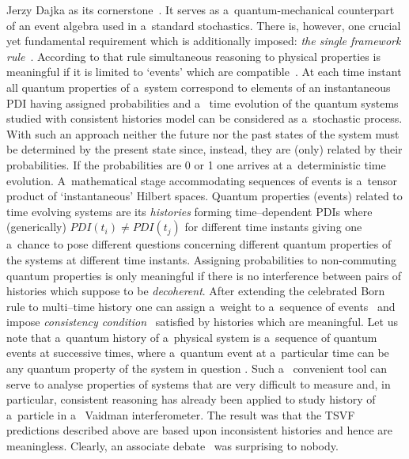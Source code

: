 \begin{artengenv}{Jerzy Dajka}
as its cornerstone~\parencite{Griffiths}. It   serves as a~quantum-mechanical counterpart of an event algebra used in a~standard stochastics. There is, however, one  crucial yet fundamental requirement which is additionally imposed: {\it the single framework rule}~\parencite{Griffiths,Griffiths_reason,GRIFFITHS_measur}. According to that rule  simultaneous reasoning to physical properties is meaningful if it is limited to  `events'  which are compatible~\parencite{Griffiths,Griffiths_reason,GRIFFITHS_measur,GRIFFITHS_onto}. 
At each time instant all  quantum properties of a~system correspond to elements of an instantaneous PDI having assigned probabilities and a~ time  evolution  of the quantum systems studied with consistent histories model can be considered as a~stochastic process. With such an approach neither 
the future nor the past states of the system must be 
determined by the present state since,  instead, they are (only) related by their probabilities. If the probabilities are 0 or 1 one arrives at a~deterministic time evolution. A~mathematical stage accommodating  sequences of events is a~tensor product of `instantaneous' Hilbert spaces. 
%
Quantum properties (events) related to time evolving systems are its {\it histories} forming time--dependent PDIs 
where (generically) $PDI(t_i)\neq PDI(t_j)$ for different time instants giving one a~chance to pose different questions concerning different quantum properties of the systems at different time instants. 
Assigning probabilities to non-commuting quantum properties  is only meaningful if there is
no interference between pairs of histories which suppose to be {\it decoherent}. 
After extending the celebrated Born rule to multi--time history  one can assign a~weight to a~sequence of events~\parencite{Griffiths1984,Griffiths,Griffiths_reason,GRIFFITHS_onto, GRIFFITHS_measur} and impose  {\it consistency condition}~\parencite{Griffiths1984,Griffiths,Griffiths_reason,GRIFFITHS_onto, GRIFFITHS_measur} satisfied by histories which are meaningful.
Let us note that a~quantum history of a~physical system is a~sequence of quantum events at successive times, where a~quantum event at a~particular time can be any quantum property of the system in question \parencite{Griffiths}. Such a~ convenient tool can  serve to analyse properties of systems that are very difficult to measure and, in particular, consistent reasoning has already been applied to study history of a~particle in a~ Vaidman interferometer. The result was that the TSVF predictions described above are based upon inconsistent histories and hence are meaningless.  Clearly, an associate debate~\parencite{PhysRevA.94.032115,PhysRevA.95.066101} was surprising to nobody.

\end{artengenv}
